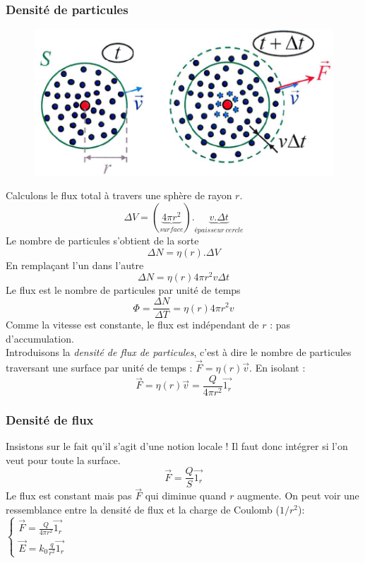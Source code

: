 \documentclass	[11pt, a4paper, openany]{book}
\begin{document}
\subsubsection{Densité de particules}
\begin{figure}
	\includegraphics[scale=0.34]{es/image6.png}
\end{figure}
Calculons le flux total à travers une sphère de rayon $r$.
\begin{equation}
	\Delta V = \left(\underbrace{4\pi r^2}_{surface}\right) . \underbrace{v.\Delta t}_{épaisseur\ cercle}
\end{equation}
Le nombre de particules s'obtient de la sorte
\begin{equation}
	\Delta N = \eta(r).\Delta V
\end{equation}
En remplaçant l'un dans l'autre
\begin{equation}
	\Delta N = \eta (r) 4\pi r^2 v\Delta t
\end{equation}
Le flux est le nombre de particules par unité de temps 
\begin{equation}
	\Phi = \frac{\Delta N}{\Delta T} = \eta (r) 4\pi r^2 v
\end{equation}
Comme la vitesse est constante, le flux est indépendant de $r$ : pas d'accumulation.\\

Introduisons la \textit{densité de flux de particules}, c'est à dire le nombre de particules traversant une surface par unité de temps : $\vec{F} = \eta (r)\vec{v}$. En isolant :
\begin{equation}
	\vec{F} = \eta (r)\vec{v} = \frac{Q}{4\pi r^2}\vec{1_r}
\end{equation}

\subsubsection{Densité de flux}
Insistons sur le fait qu'il s'agit d'une notion locale ! Il faut donc intégrer si l'on veut pour toute la surface.
\begin{equation}
	\vec{F} = \frac{Q}{S}\vec{1_r}
\end{equation}
Le flux est constant mais pas $\vec{F}$ qui diminue quand $r$ augmente. On peut voir une ressemblance entre la densité de flux et la charge de Coulomb ($1/r^2$):
$\left\{\begin{array}{l}
\vec{F} = \frac{Q}{4\pi r^2}\vec{1_r}\\
\vec{E} = k_0 \frac{q}{r^2}\vec{1_r}
\end{array}\right.$
\end{document}
